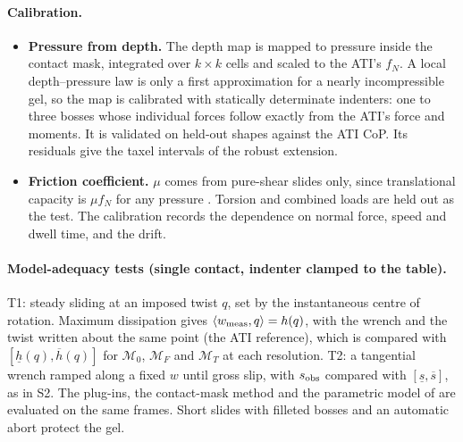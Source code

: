 \documentclass[11pt,a4paper]{article}
\newcommand{\M}{\mathcal M}
\begin{document}
\paragraph{Calibration.}
\begin{itemize}
    \item \textbf{Pressure from depth.} The depth map is mapped to pressure inside the contact mask, integrated over $k\times k$ cells and scaled to the
    ATI's $f_N$. A local depth--pressure law is only a first approximation for a nearly incompressible gel, so the map is calibrated with statically
    determinate indenters: one to three bosses whose individual forces follow exactly from the ATI's force and moments. It is validated on held-out
    shapes against the ATI CoP. Its residuals give the taxel intervals of the robust extension.
    \item \textbf{Friction coefficient.} $\mu$ comes from pure-shear slides only, since translational capacity is $\mu f_N$ for any pressure
    \citep[§2.3]{howe1996practical}. Torsion and combined loads are held out as the test. The calibration records the dependence on normal force,
    speed and dwell time, and the drift.
\end{itemize}
\paragraph{Model-adequacy tests (single contact, indenter clamped to the table).} T1: steady sliding at an imposed twist $q$, set by the instantaneous
centre of rotation. Maximum dissipation gives $\langle w_{\rm meas},q\rangle=h(q)$, with the wrench and the twist written about the same point (the ATI reference),
which is compared with $[\underline h(q),\overline h(q)]$ for $\M_0$, $\M_F$ and $\M_T$ at each resolution. T2: a tangential wrench ramped along a fixed $w$ until gross slip, with $s_{\rm obs}$ compared with $[\underline s,\overline s]$, as
in S2. The plug-ins, the contact-mask method and the parametric model of \citet{costanzo2020two} are evaluated on the same frames. Short slides with
filleted bosses and an automatic abort protect the gel.
\end{document}
